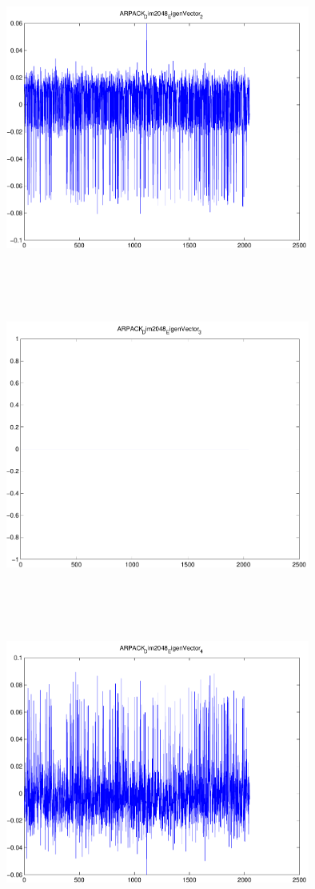 \documentclass[9pt]{article}
\theoremstyle{plain}
\theoremstyle{definition}
\theoremstyle{remark}
\numberwithin{equation}{section}
\begin{document}
\includegraphics[width=10.0cm,height=10.0cm]{ARPACK_Dim2048_EigenVector_2.pdf}

\includegraphics[width=10.0cm,height=10.0cm]{ARPACK_Dim2048_EigenVector_3.pdf}

\includegraphics[width=10.0cm,height=10.0cm]{ARPACK_Dim2048_EigenVector_4.pdf}
\end{document}
